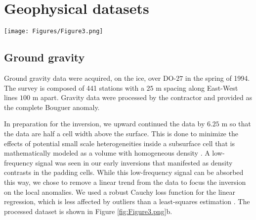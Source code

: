 \documentclass[paper, twocolumn]{geophysics} %
\begin{document}
\section{Geophysical datasets}


\begin{figure*}[!ht]%
\centering
\texttt{[image: Figures/Figure3.png]}
\caption{Four potential field datasets, collected over the DO-$27$ pipe, that are used in this study (after regional removal). (a) Airborne VTEM total field magnetic survey; (b) Ground gravity survey; (c) $G_{xy}$ component of the airborne Falcon gravity gradiometry survey; (d) $G_{uv}$ component of the airborne Falcon gravity gradiometry survey.}
\label{fig:Figure3.png}
\end{figure*}%


\subsection{Ground gravity}

Ground gravity data were acquired, on the ice, over DO-$27$ in the spring of 1994. The survey is composed of 441 stations with a $25$ m spacing along East-West lines $100$ m apart. Gravity data were processed by the contractor and provided as the complete Bouguer anomaly.

In preparation for the inversion, we upward continued the data by $6.25$ m so that the data are half a cell width above the surface. This is done to minimize the effects of potential small scale heterogeneities inside a subsurface cell that is mathematically modeled as a volume with homogeneous density \citep{Li1996}. A low-frequency signal was seen in our early inversions that manifested as density contrasts in the padding cells. While this low-frequency signal can be absorbed this way, we chose to remove a linear trend from the data to focus the inversion on the local anomalies. We used a robust Cauchy loss function for the linear regression, which is less affected by outliers than a least-squares estimation \citep{CauchyNorm}. The processed dataset is shown in Figure \ref{fig:Figure3.png}b.
\end{document}
